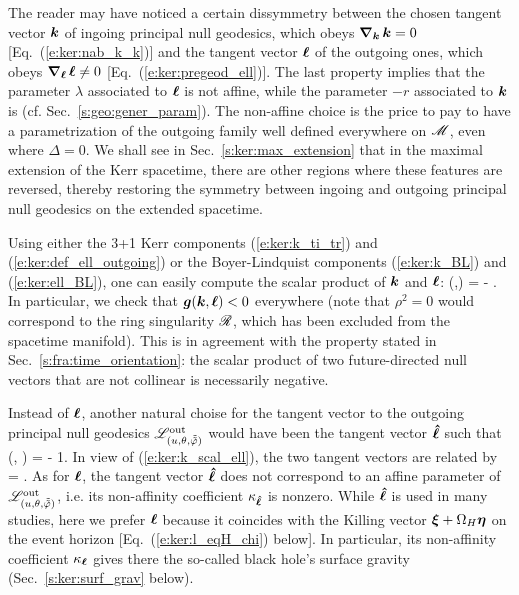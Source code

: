 \begin{remark}
The reader may have noticed a certain dissymmetry between the chosen tangent vector
$\bm{k}$ of ingoing principal null geodesics, which obeys $\bm{\nabla}_{\bm{k}}\, \bm{k} = 0$
[Eq.~(\ref{e:ker:nab_k_k})] and the tangent vector $\bm{\ell}$ of the outgoing
ones, which obeys $\bm{\nabla}_{\bm{\ell}}\, \bm{\ell} \not= 0$ [Eq.~(\ref{e:ker:pregeod_ell})].
The last property implies that the
parameter $\lambda$ associated to $\bm{\ell}$ is not affine, while the
parameter $-r$ associated to $\bm{k}$ is (cf. Sec.~\ref{s:geo:gener_param}).
The non-affine choice is the price to pay to have a parametrization of the outgoing
family well defined everywhere on $\mathscr{M}$, even where $\Delta=0$. We shall see in
Sec.~\ref{s:ker:max_extension} that in the maximal extension of the Kerr spacetime, there are other regions
where these features are reversed,
thereby restoring the symmetry between ingoing and outgoing principal null geodesics
on the extended spacetime.
\end{remark}

\begin{remark}
Using either the 3+1 Kerr components (\ref{e:ker:k_ti_tr}) and
(\ref{e:ker:def_ell_outgoing})
or the Boyer-Lindquist components (\ref{e:ker:k_BL}) and (\ref{e:ker:ell_BL}),
one can easily compute the scalar product of $\bm{k}$ and $\bm{\ell}$:
\be \label{e:ker:k_scal_ell}
    (,\wl) = -  .
\ee
In particular, we check that $\bm{g}(\bm{k},\bm{\ell}) < 0$ everywhere (note that $\rho^2= 0$
would correspond to the ring singularity $\mathscr{R}$, which has been excluded from
the spacetime manifold). This is in agreement with
the property stated in Sec.~\ref{s:fra:time_orientation}: the scalar product of
two future-directed null vectors that are not collinear is necessarily negative.
\end{remark}

\begin{remark}
Instead of $\bm{\ell}$, another natural choise for the tangent vector to the outgoing
principal null geodesics $\mathscr{L}^{\rm out}_{(u,\theta,\tilde{{\tilde\varphi}})}$ would have been the tangent vector $\bm{\hat{\ell}}$
such that
\be
    (, \w{\hat{\el}}) = - 1.
\ee
In view of (\ref{e:ker:k_scal_ell}), the two tangent vectors are related by
\be
    \w{\hat{\el}} =  \wl .
\ee
As for $\bm{\ell}$, the tangent vector $\bm{\hat{\ell}}$ does not correspond to
an affine parameter of $\mathscr{L}^{\rm out}_{(u,\theta,\tilde{{\tilde\varphi}})}$, i.e. its
non-affinity coefficient $\kappa_{\bm{\hat{\ell}}}$ is nonzero. While
$\bm{\hat{\ell}}$ is used in many studies, here we prefer $\bm{\ell}$ because it
coincides with the Killing vector $\bm{\xi} + \Omega_H \bm{\eta}$
on the event horizon [Eq.~(\ref{e:ker:l_eqH_chi}) below]. In particular, its
non-affinity coefficient $\kappa_{\bm{\ell}}$ gives there the so-called
black hole's surface gravity (Sec.~\ref{s:ker:surf_grav} below).
\end{remark}

